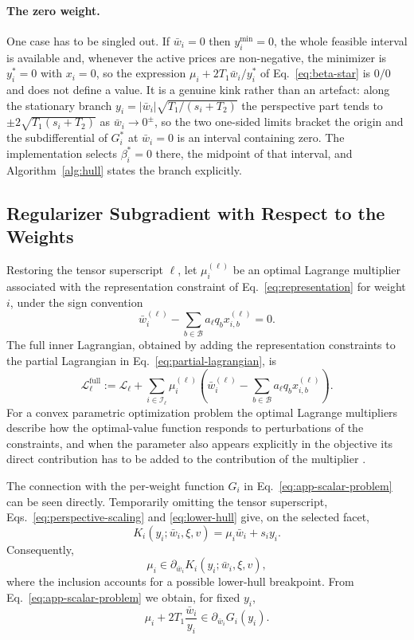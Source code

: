 \documentclass{article}
\begin{document}
\paragraph{The zero weight.} One case has to be singled out. If $\bar w_i=0$ then
$y_i^{\min}=0$, the whole feasible interval is available and, whenever the active
prices are non-negative, the minimizer is $y_i^*=0$ with $x_i=0$, so the
expression $\mu_i+2T_1\bar w_i/y_i^*$ of Eq.~\eqref{eq:beta-star} is $0/0$ and
does not define a value. It is a genuine kink rather than an artefact: along the
stationary branch $y_i=|\bar w_i|\sqrt{T_1/(s_i+T_2)}$ the perspective part tends
to $\pm2\sqrt{T_1(s_i+T_2)}$ as $\bar w_i\to0^{\pm}$, so the two one-sided limits
bracket the origin and the subdifferential of $G_i^*$ at $\bar w_i=0$ is an
interval containing zero. The implementation selects $\beta_i^*=0$ there, the
midpoint of that interval, and Algorithm~\ref{alg:hull} states the branch
explicitly.


\subsection{Regularizer Subgradient with Respect to the Weights}
\label{app:weight-grad}
\label{app:weight-gradient}
\label{sec:regularizer-weight-subgradient}

Restoring the tensor superscript $\ell$, let $\mu_i^{(\ell)}$ be an optimal
Lagrange multiplier associated with the representation constraint of
Eq.~\eqref{eq:representation} for weight $i$, under the sign convention
\[
  \bar w_i^{(\ell)}
  -\sum_{b\in\mathcal B}
   a_\ell q_bx_{i,b}^{(\ell)}
  =0.
\]
The full inner Lagrangian, obtained by adding the representation constraints
to the partial Lagrangian in Eq.~\eqref{eq:partial-lagrangian}, is
\[
  \mathscr L_\ell^{\mathrm{full}}
  :=
  \mathscr L_\ell
  +
  \sum_{i\in\mathcal I_\ell}
  \mu_i^{(\ell)}
  \left(
    \bar w_i^{(\ell)}
    -
    \sum_{b\in\mathcal B}
    a_\ell q_bx_{i,b}^{(\ell)}
  \right).
\]
For a convex parametric optimization problem the optimal Lagrange multipliers
describe how the optimal-value function responds to perturbations of the
constraints, and when the parameter also appears explicitly in the objective its
direct contribution has to be added to the contribution of the multiplier
\citep{bonnans2000perturbation}.

The connection with the per-weight function $G_i$ in
Eq.~\eqref{eq:app-scalar-problem} can be seen directly. Temporarily omitting the
tensor superscript, Eqs.~\eqref{eq:perspective-scaling} and
\eqref{eq:lower-hull} give, on the selected facet,
\[
  K_i(y_i;\bar w_i,\xi,v)
  =
  \mu_i\bar w_i+s_i y_i.
\]
Consequently,
\[
  \mu_i
  \in
  \partial_{\bar w_i}
  K_i(y_i;\bar w_i,\xi,v),
\]
where the inclusion accounts for a possible lower-hull breakpoint. From Eq.~\eqref{eq:app-scalar-problem}
we obtain, for fixed $y_i$,
\[
  \mu_i+2T_1\frac{\bar w_i}{y_i}
  \in
  \partial_{\bar w_i}G_i(y_i).
\]
\end{document}
